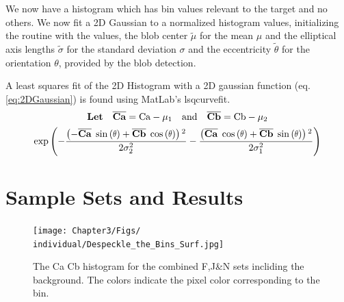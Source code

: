 We now have a histogram which has bin values relevant to the target and no others. We now fit a 2D Gaussian to a normalized histogram values, initializing the routine with the values, the blob center $\widetilde{\mu}$ for the mean $\mu$ and the  elliptical axis lengths $\widetilde{\sigma}$ for the standard deviation $\sigma$  and the eccentricity $\widetilde{\theta}$  for the orientation $\theta$, provided by the blob detection.

A least squares fit of the 2D Histogram with a 2D gaussian function (eq. \ref{eq:2DGaussian})  is found using MatLab's lsqcurvefit.
\newcommand{\CaMu}{ \overline{\mathbf{Ca}} }
\newcommand{\CbMu}{\overline{\mathbf{Cb}}  }
\begin{gather}\label{eq:2DGaussian}
\textbf{Let} \quad \CaMu = \text{Ca}-\mu_1 \quad \text{and} \quad \CbMu = \text{Cb}-\mu_2 \\
\exp \left(
-\frac{\left( - \CaMu \; \sine{     \theta } + \CbMu \; \cosine{ \theta } \right){}^2}{2 \sigma_2^2} - 
\frac{\left(      \CaMu \; \cosine{ \theta } + \CbMu \; \sine{      \theta} \right){}^2}{2 \sigma_1^2} \right)
\end{gather}



\section{Sample Sets and Results}\label{sec:SampleSets}

\begin{figure}[h!]
  \centering
    \texttt{[image: Chapter3/Figs/\\individual/Despeckle\_the\_Bins\_Surf.jpg]}
        \caption{The Ca Cb histogram for the combined F,J\&N sets incliding the background. The colors indicate the pixel color corresponding to the bin. }  \label{fig:Despeckle_the_Bins_Surf}
    \end{figure}

